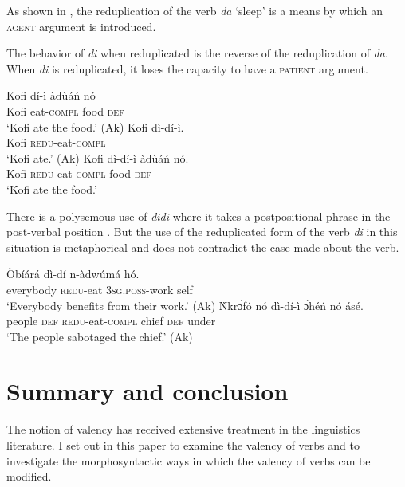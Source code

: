 \documentclass[output=paper]{langsci/langscibook}
\begin{document}
As shown in , the reduplication of the verb \textit{da} `sleep' is a means by which an \textsc{agent} argument is introduced.

The behavior of \textit{di} when reduplicated is the reverse of the reduplication of \textit{da}. When \textit{di} is reduplicated, it loses the capacity to have a \textsc{patient} argument.

\ea\label{ex:48.osam}
\ea\label{ex:48a.osam}
\gll  Kofi  dí-ì    àdùáń    nó\\
       Kofi  eat-\textsc{compl}  food    \textsc{def}\\
\glt   `Kofi ate the food.' (Ak)
\ex\label{ex:48b.osam}
\gll Kofi  dì-dí-ì.\\
       Kofi  \textsc{redu}-eat-\textsc{compl}\\
\glt   `Kofi ate.' (Ak)
\ex\label{ex:48c.osam}
\gll   Kofi  dì-dí-ì      àdùáń    nó.\\
       Kofi  \textsc{redu}-eat-\textsc{compl}  food    \textsc{def}\\
\glt   `Kofi ate the food.'
\z 
\z 


There is a polysemous use of \textit{didi} where it takes a postpositional phrase in the post-verbal position . But the use of the reduplicated form of the verb \textit{di} in this situation is metaphorical and does not contradict the case made about the verb.

\ea\label{ex:49.osam}
\ea\label{ex:49a.osam}
\gll  Òbíárá    dì-dí    n-àdwúmá    hó.\\
       everybody  \textsc{redu}-eat  \textsc{3sg.poss}-work  self\\
\glt   `Everybody benefits from their work.' (Ak)
\ex\label{ex:49b.osam}
\gll    \`{N}krɔ̀fó  nó  dì-dí-ì      ɔ̀héń   nó  ásé.\\
       people  \textsc{def}  \textsc{redu}-eat-\textsc{compl}  chief  \textsc{def}  under\\
\glt   `The people sabotaged the chief.' (Ak)
\z 
\z 


\section{Summary and conclusion}\label{§7:summary.osam}

The notion of valency has received extensive treatment in the linguistics literature. I set out in this paper to examine the valency of  verbs and to investigate the morphosyntactic ways in which the valency of verbs can be modified. 
\end{document}
